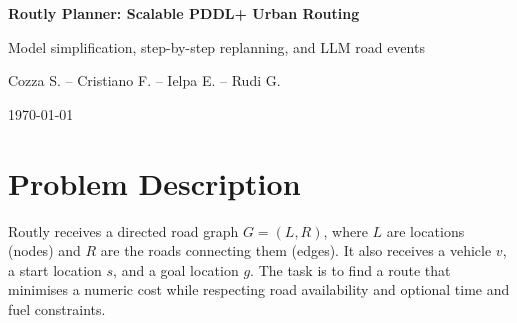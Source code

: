 \documentclass[10pt]{article}
\begin{document}
\begin{center}
  {\LARGE\bfseries Routly Planner: Scalable PDDL+ Urban Routing\par}
  \vspace{0.20em}
  {\large Model simplification, step-by-step replanning, and LLM road events\par}
  \vspace{0.65em}
  {\normalsize Cozza S. -- Cristiano F. -- Ielpa E. -- Rudi G.\par}
  \vspace{0.45em}
  {\normalsize \today\par}
\end{center}
\vspace{-0.35em}

\begin{abstract}
Routly Planner is a framework for urban route planning over real OpenStreetMap networks. It downloads a city's road map from OpenStreetMap with OSMnx, ENHSP solves a PDDL-based problem, and SUMO validates the resulting route in a traffic simulation. The model can include traffic that slows roads down, traffic lights, closed roads, and (optionally) fuel limits. These features make the routes more realistic, but they also increase the computational cost of planning. Routly studies two different scalability strategies. The \emph{model-side} branch improves scalability by simplifying the planning model before it is given to the planner. The \emph{controller-side} branch keeps the
detailed PDDL+ process model but solves the trip in smaller pieces and joins them, for congestion or for fuel. A separate LLM layer generates structured road closures and slowdowns using topology and start/goal information, without ever seeing the planned route; a second planning run then measures how well the route adapts. All modelling choices and experimental parameters are recorded through validated YAML configuration snapshots.
\end{abstract}
\vspace{-0.35em}

\section{Problem Description}

Routly receives a directed road graph $G=(L,R)$, where $L$ are locations (nodes) and $R$ are the roads connecting
them (edges). It also receives a vehicle $v$, a start location $s$, and a goal location
$g$. The task is to find a route that minimises a numeric cost while
respecting road availability and optional time and fuel constraints.
\end{document}
